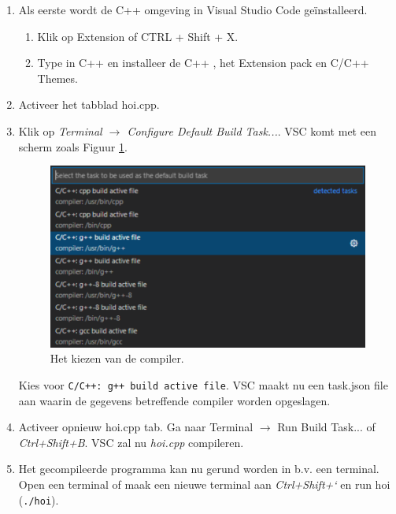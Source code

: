 \begin{enumerate}
     \begin{enumerate}
     	\item  Als eerste wordt de C++ omgeving in Visual Studio Code geïnstalleerd.
     	\begin{enumerate}
     		\item Klik op Extension  of CTRL + Shift + X.
     		\item Type in C++ en installeer de C++  , het Extension pack en C/C++ Themes.
        \end{enumerate}
     	\item Activeer het tabblad hoi.cpp.
     	\item Klik op \textit{Terminal $\rightarrow$ Configure Default Build Task...}. VSC komt met een scherm zoals Figuur \ref{fig:vscComp}.
\begin{figure}[h!]
	\captionsetup{justification=centering}
	\includegraphics[width=0.6 \linewidth]{figuren/VSCcompile}
	\centering
	\caption{Het kiezen van de compiler.}
	\label{fig:vscComp}
\end{figure}     	
Kies voor \texttt{C/C++: g++ build active file}.
VSC maakt nu een task.json file aan waarin de gegevens betreffende compiler worden opgeslagen.
\item Activeer opnieuw hoi.cpp tab. Ga naar Terminal $\rightarrow$ Run Build Task... of \textit{Ctrl+Shift+B}. VSC zal nu \textit{hoi.cpp} compileren.

\item Het gecompileerde programma kan nu gerund worden in b.v. een terminal. Open een terminal of maak een nieuwe terminal aan \textit{Ctrl+Shift+`} en run hoi (\texttt{./hoi}).
\end{enumerate}
     

\end{enumerate}
